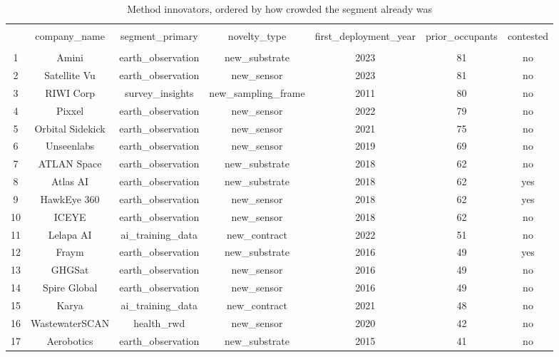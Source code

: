 
\begin{table}[!htbp] \centering 
  \caption{Method innovators, ordered by how crowded the segment already was} 
  \label{} 
\begin{tabular}{@{\extracolsep{5pt}} ccccccc} 
\\[-1.8ex]\hline 
\hline \\[-1.8ex] 
 & company\_name & segment\_primary & novelty\_type & first\_deployment\_year & prior\_occupants & contested \\ 
\hline \\[-1.8ex] 
1 & Amini & earth\_observation & new\_substrate & 2023 & 81 & no \\ 
2 & Satellite Vu & earth\_observation & new\_sensor & 2023 & 81 & no \\ 
3 & RIWI Corp & survey\_insights & new\_sampling\_frame & 2011 & 80 & no \\ 
4 & Pixxel & earth\_observation & new\_sensor & 2022 & 79 & no \\ 
5 & Orbital Sidekick & earth\_observation & new\_sensor & 2021 & 75 & no \\ 
6 & Unseenlabs & earth\_observation & new\_sensor & 2019 & 69 & no \\ 
7 & ATLAN Space & earth\_observation & new\_substrate & 2018 & 62 & no \\ 
8 & Atlas AI & earth\_observation & new\_substrate & 2018 & 62 & yes \\ 
9 & HawkEye 360 & earth\_observation & new\_sensor & 2018 & 62 & yes \\ 
10 & ICEYE & earth\_observation & new\_sensor & 2018 & 62 & no \\ 
11 & Lelapa AI & ai\_training\_data & new\_contract & 2022 & 51 & no \\ 
12 & Fraym & earth\_observation & new\_substrate & 2016 & 49 & yes \\ 
13 & GHGSat & earth\_observation & new\_sensor & 2016 & 49 & no \\ 
14 & Spire Global & earth\_observation & new\_sensor & 2016 & 49 & no \\ 
15 & Karya & ai\_training\_data & new\_contract & 2021 & 48 & no \\ 
16 & WastewaterSCAN & health\_rwd & new\_sensor & 2020 & 42 & no \\ 
17 & Aerobotics & earth\_observation & new\_substrate & 2015 & 41 & no \\ 

\end{tabular}
\end{table}
